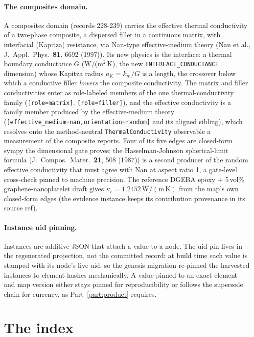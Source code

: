 \documentclass[11pt,a4paper]{article}
\begin{document}
\paragraph{The composites domain.} A composites domain (records 228-239) carries
the effective thermal conductivity of a two-phase composite, a dispersed filler
in a continuous matrix, with interfacial (Kapitza) resistance, via Nan-type
effective-medium theory (Nan et al., J.\ Appl.\ Phys.\ \textbf{81}, 6692 (1997)).
Its new physics is the interface: a thermal boundary conductance $G$ (W/(m$^2$\,K),
the new \texttt{INTERFACE\_CONDUCTANCE} dimension) whose Kapitza radius
$a_K = k_m / G$ is a length, the crossover below which a conductive filler
\emph{lowers} the composite conductivity. The matrix and filler conductivities
enter as role-labeled members of the one thermal-conductivity family
(\texttt{[role=matrix]}, \texttt{[role=filler]}), and the effective conductivity
is a family member produced by the effective-medium theory
(\texttt{[effective\_medium=nan,orientation=random]} and its aligned sibling),
which resolves onto the method-neutral \texttt{ThermalConductivity} observable a
measurement of the composite reports. Four of its five edges are closed-form
sympy the dimensional gate proves; the Hasselman-Johnson spherical-limit formula
(J.\ Compos.\ Mater.\ \textbf{21}, 508 (1987)) is a second producer of the
random effective conductivity that must agree with Nan at aspect ratio 1, a
gate-level cross-check pinned to machine precision. The reference DGEBA epoxy +
5\,vol\% graphene-nanoplatelet draft gives $\kappa_c = 1.2452\,\mathrm{W/(m\,K)}$
from the map's own closed-form edges (the evidence instance keeps its
contribution provenance in its source ref).

\paragraph{Instance uid pinning.} Instances are additive JSON that attach a value
to a node. The uid pin lives in the regenerated projection, not the committed
record: at build time each value is stamped with its node's live uid, so the
genesis migration re-pinned the harvested instances to element hashes
mechanically. A value
pinned to an exact element and map version either stays pinned for reproducibility
or follows the supersede chain for currency, as Part~\ref{part:product} requires.

\section{The index}
\label{sec:kernel-index}
\end{document}
